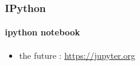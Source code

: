 \begin{frame}[fragile]
\frametitle{IPython}
\framesubtitle{ipython notebook}
\begin{itemize}
 \item the future : \url{https://jupyter.org}   
\end{itemize}
\begin{center}
\end{center}
\end{frame}


